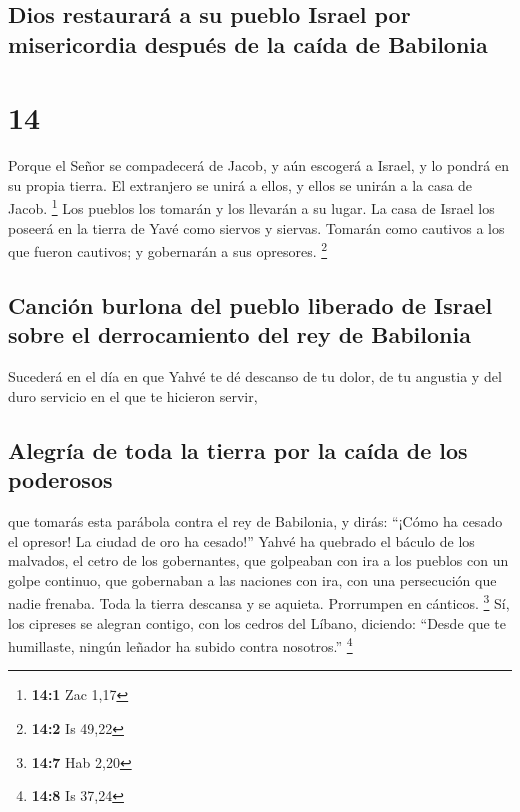 \hypertarget{dios-restauraruxe1-a-su-pueblo-israel-por-misericordia-despuuxe9s-de-la-cauxedda-de-babilonia}{%
\subsection{Dios restaurará a su pueblo Israel por misericordia después
de la caída de
Babilonia}\label{dios-restauraruxe1-a-su-pueblo-israel-por-misericordia-despuuxe9s-de-la-cauxedda-de-babilonia}}

\hypertarget{section-13}{%
\section{14}\label{section-13}}

 Porque el Señor se compadecerá de Jacob, y aún escogerá a
Israel, y lo pondrá en su propia tierra. El extranjero se unirá a ellos,
y ellos se unirán a la casa de Jacob. \footnote{\textbf{14:1} Zac 1,17}
 Los pueblos los tomarán y los llevarán a su lugar. La
casa de Israel los poseerá en la tierra de Yavé como siervos y siervas.
Tomarán como cautivos a los que fueron cautivos; y gobernarán a sus
opresores. \footnote{\textbf{14:2} Is 49,22}

\hypertarget{canciuxf3n-burlona-del-pueblo-liberado-de-israel-sobre-el-derrocamiento-del-rey-de-babilonia}{%
\subsection{Canción burlona del pueblo liberado de Israel sobre el
derrocamiento del rey de
Babilonia}\label{canciuxf3n-burlona-del-pueblo-liberado-de-israel-sobre-el-derrocamiento-del-rey-de-babilonia}}

 Sucederá en el día en que Yahvé te dé descanso de tu
dolor, de tu angustia y del duro servicio en el que te hicieron servir,

\hypertarget{alegruxeda-de-toda-la-tierra-por-la-cauxedda-de-los-poderosos}{%
\subsection{Alegría de toda la tierra por la caída de los
poderosos}\label{alegruxeda-de-toda-la-tierra-por-la-cauxedda-de-los-poderosos}}

 que tomarás esta parábola contra el rey de Babilonia, y
dirás: ``¡Cómo ha cesado el opresor! La ciudad de oro ha cesado!''
 Yahvé ha quebrado el báculo de los malvados, el cetro de
los gobernantes,  que golpeaban con ira a los pueblos con
un golpe continuo, que gobernaban a las naciones con ira, con una
persecución que nadie frenaba.  Toda la tierra descansa y
se aquieta. Prorrumpen en cánticos. \footnote{\textbf{14:7} Hab 2,20}
 Sí, los cipreses se alegran contigo, con los cedros del
Líbano, diciendo: ``Desde que te humillaste, ningún leñador ha subido
contra nosotros.'' \footnote{\textbf{14:8} Is 37,24}

